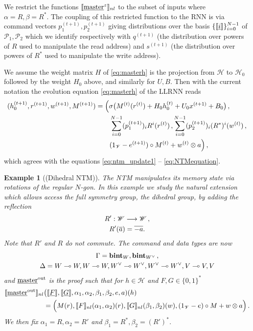 \documentclass[english,letter paper,12pt,leqno]{article}
\theoremstyle{example}
\newtheorem{example}[theorem]{Example}
\numberwithin{equation}{section}
\begin{document}
We restrict the functions $\llbracket \underline{\textup{master}}^z \rrbracket_{nl}$ to the subset of inputs where $\alpha = R, \beta = R^*$. The coupling of this restricted function to the RNN is via command vectors $p_1^{(t+1)}, p_2^{(t+1)}$ giving distributions over the basis $\{ \llbracket \underline{i} \rrbracket \}_{i=0}^{N-1}$ of $\mathscr{P}_1,\mathscr{P}_2$ which we identify respectively with $q^{(t+1)}$ (the distribution over powers of $R$ used to manipulate the read address) and $s^{(t+1)}$ (the distribution over powers of $R^*$ used to manipulate the write address).

We assume the weight matrix $H$ of \eqref{eq:masterh} is the projection from $\mathscr{H}$ to $\mathscr{H}_0$ followed by the weight $H_0$ above, and similarly for $U,B$. Then with the current notation the evolution equation \eqref{eq:masterh} of the LLRNN reads
\begin{align*}
(h_0^{(t+1)}, r^{(t+1)}, w^{(t+1)}, M^{(t+1)}) &= \Big( \sigma\big( M^{(t)}(r^{(t)}) + H_0 h_0^{(t)} + U_0 x^{(t+1)} + B_0 \big)\,,\\
&\qquad \sum_{i=0}^{N-1} (p_1^{(t+1)})_i R^i( r^{(t)} )\,, \sum_{i=0}^{N-1} (p_2^{(t+1)})_i (R^*)^i( w^{(t)} )\,,\\
&\qquad (1_{\mathscr{V}} - e^{(t+1)} ) \circ M^{(t)} + w^{(t)} \otimes a \Big)\,,
\end{align*}
which agrees with the equations \eqref{eq:ntm_update1} -- \eqref{eq:NTMequation}.

\begin{example}[(Dihedral NTM)]\label{example:dihedral} The NTM manipulates its memory state via rotations of the regular $N$-gon. In this example we study the natural extension which allows access the full symmetry group, the dihedral group, by adding the reflection
\begin{gather*}
R': \mathscr{W} \longrightarrow \mathscr{W}\,,\\
R'(\overline{a}) = \overline{-a}.
\end{gather*}
Note that $R'$ and $R$ do not commute. The command and data types are now
\begin{gather*}
\Gamma = \textbf{bint}_W, \textbf{bint}_{W^{\vee}}\,,\\
\Delta = W \multimap W, W \multimap W, W^{\vee} \multimap W^{\vee}, W^{\vee} \multimap W^{\vee}, V \multimap V, V
\end{gather*}
and $\underline{\textup{master}}^{\mathrm{out}}$ is the proof such that for $h \in \mathscr{H}$ and $F,G \in \{0,1\}^*$
\begin{align*}
\llbracket \underline{\textup{master}}^{\mathrm{out}} \rrbracket_{nl}&\big( \llbracket \underline{F} \rrbracket, \llbracket \underline{G} \rrbracket, \alpha_1, \alpha_2, \beta_1, \beta_2, e, a )(h)\\
& = \Big(M(r), \llbracket F \rrbracket_{nl}(\alpha_1,\alpha_2)(r),\llbracket G \rrbracket_{nl}(\beta_1,\beta_2)(w), (1_{\mathscr{V}} - e) \circ M + w \otimes a\Big)\,.
\end{align*}
We then fix $\alpha_1 = R, \alpha_2 = R'$ and $\beta_1 = R^*, \beta_2 = (R')^*$.
\end{example}
\end{document}
